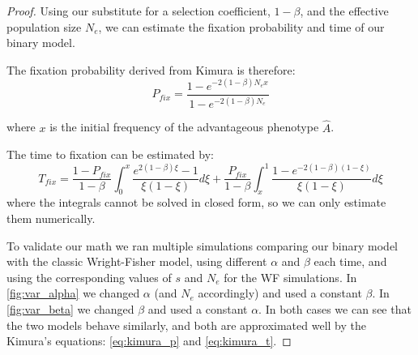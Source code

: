 \documentclass[12pt]{extarticle}
\begin{document}
\begin{proof}
Using our substitute for a selection coefficient, $1-\beta$, and the effective population size $N_e$, we can estimate the fixation probability and time of our binary model.

The fixation probability derived from Kimura is therefore:
\begin{equation}\label{eq:kimura_p}
P_{fix} = \frac{1-e^{-2(1-\beta)N_e x}}{1-e^{-2(1-\beta)N_e}}
\end{equation}

where $x$ is the initial frequency of the advantageous phenotype $\hat{A}$.

The time to fixation can be estimated by:
\begin{equation}\label{eq:kimura_t}
T_{fix}=\frac{1-P_{fix}}{1-\beta}\int_0^x\frac{e^{2(1-\beta) \xi}-1}{\xi(1-\xi)}d\xi+ \frac{P_{fix}}{1-\beta}\int_x^1\frac{1-e^{-2(1-\beta)(1-\xi)}}{\xi(1-\xi)}d\xi
\end{equation}
where the integrals cannot be solved in closed form, so we can only estimate them numerically.

To validate our math we ran multiple simulations comparing our binary model with the classic Wright-Fisher model, using different $\alpha$ and $\beta$ each time, and using the corresponding values of $s$ and $N_e$ for the WF simulations.
In \cref{fig:var_alpha} we changed $\alpha$ (and $N_e$ accordingly) and used a constant $\beta$.
In \cref{fig:var_beta} we changed $\beta$ and used a constant $\alpha$.
In both cases we can see that the two models behave similarly, and both are approximated well by the Kimura's equations: \cref{eq:kimura_p} and \cref{eq:kimura_t}.



\end{proof}
\end{document}
